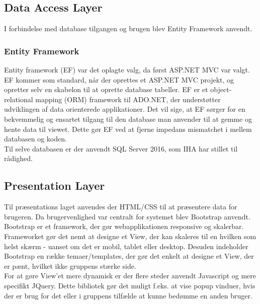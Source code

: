 \subsection{Data Access Layer}
I forbindelse med database tilgangen og brugen blev Entity Framework anvendt.
 
 \subsubsection{Entity Framework}
Entity framework (EF)\cite{ADOEF} var det oplagte valg, da først ASP.NET MVC var valgt. EF kommer som standard, når der oprettes et ASP.NET MVC projekt, og opretter selv en skabelon til at oprette database tabeller. EF er et object-relational mapping (ORM) framework til ADO.NET, der understøtter udviklingen af data orienterede applikationer. Det vil sige, at EF sørger for en bekvemmelig og ensartet tilgang til den database man anvender til at gemme og hente data til viewet. Dette gør EF ved at fjerne impedans mismatchet i mellem databasen og koden.\\
 \noindent Til selve databasen er der anvendt SQL Server 2016, som IHA har stillet til rådighed.
 
\subsection{Presentation Layer}
Til præsentations laget anvendes der HTML/CSS til at præsentere data for brugeren. Da brugervenlighed var centralt for systemet blev Bootstrap\cite{Bootstrap} anvendt. Bootstrap er et framework, der gør webapplikationen responsive og skalerbar. Frameworket gør det nemt at designe et View, der kan skaleres til en hvilken som helst skærm - uanset om det er mobil, tablet eller desktop. Desuden indeholder Bootstrap en række temaer/templates, der gør det enkelt at designe et View, der er pænt, hvilket ikke gruppens stærke side. \\
For at gøre View'et mere dynamisk er der flere steder anvendt Javascript og mere specifikt JQuery\cite{jQuery}. 
Dette bibliotek gør det muligt f.eks. at vise popup vinduer, hvis der er brug for det eller i gruppens tilfælde at kunne bedømme en anden bruger.